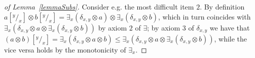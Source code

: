 \documentclass[main.tex]{subfiles}
\begin{document}
\begin{proof}[of Lemma~\ref{lemmaSubs}]
Consider e.g. the most difficult item $2$.
By definition $a[^y/_x] \otimes b[^y/_x] = \exists_x (\delta_{x,y} \otimes a) \otimes \exists_x (\delta_{x,y} \otimes b)$, which in turn coincides with $\exists_x (\delta_{x,y} \otimes a \otimes \exists_x (\delta_{x,y} \otimes b))$ by axiom $2$ of $\exists$; by axiom $3$ of $\delta_{x,y}$ we have that $(a \otimes b) [^y/_x] = \exists_x (\delta_{x,y} \otimes a \otimes b) \leq \exists_x (\delta_{x,y} \otimes a \otimes \exists_x (\delta_{x,y} \otimes b))$, while the vice versa holds by the monotonicity of $\exists_x$.
 \end{proof}


%
%
%
\end{document}
